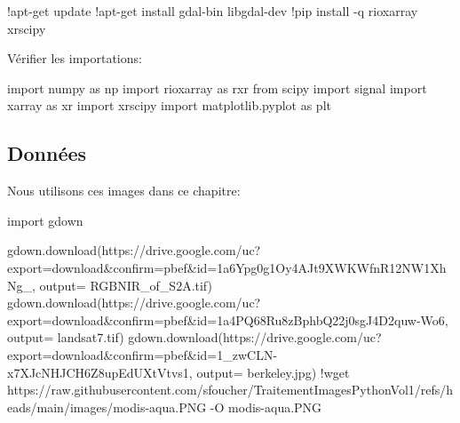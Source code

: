 \documentclass[
  french,
  11pt,
  letterpaper,
  open=any,
  twoside=false,
  french]{scrbook}
\newenvironment{Shaded}{\begin{snugshade}}{\end{snugshade}}
\newcommand{\BuiltInTok}[1]{\textcolor[rgb]{0.00,0.23,0.31}{#1}}
\newcommand{\ImportTok}[1]{\textcolor[rgb]{0.00,0.46,0.62}{#1}}
\newcommand{\NormalTok}[1]{\textcolor[rgb]{0.00,0.23,0.31}{#1}}
\newcommand{\OperatorTok}[1]{\textcolor[rgb]{0.37,0.37,0.37}{#1}}
\newcommand{\StringTok}[1]{\textcolor[rgb]{0.13,0.47,0.30}{#1}}
\begin{document}
\begin{Shaded}
\begin{Highlighting}[]
\OperatorTok{!}\NormalTok{apt}\OperatorTok{{-}}\NormalTok{get update}
\OperatorTok{!}\NormalTok{apt}\OperatorTok{{-}}\NormalTok{get install gdal}\OperatorTok{{-}}\BuiltInTok{bin}\NormalTok{ libgdal}\OperatorTok{{-}}\NormalTok{dev}
\OperatorTok{!}\NormalTok{pip install }\OperatorTok{{-}}\NormalTok{q rioxarray xrscipy}
\end{Highlighting}
\end{Shaded}

Vérifier les importations:

\begin{Shaded}
\begin{Highlighting}[]
\ImportTok{import}\NormalTok{ numpy }\ImportTok{as}\NormalTok{ np}
\ImportTok{import}\NormalTok{ rioxarray }\ImportTok{as}\NormalTok{ rxr}
\ImportTok{from}\NormalTok{ scipy }\ImportTok{import}\NormalTok{ signal}
\ImportTok{import}\NormalTok{ xarray }\ImportTok{as}\NormalTok{ xr}
\ImportTok{import}\NormalTok{ xrscipy}
\ImportTok{import}\NormalTok{ matplotlib.pyplot }\ImportTok{as}\NormalTok{ plt}
\end{Highlighting}
\end{Shaded}

\subsection{Données}\label{donnuxe9es}

Nous utilisons ces images dans ce chapitre:

\begin{Shaded}
\begin{Highlighting}[]
\ImportTok{import}\NormalTok{ gdown}

\NormalTok{gdown.download(}\StringTok{\textquotesingle{}https://drive.google.com/uc?export=download\&confirm=pbef\&id=1a6Ypg0g1Oy4AJt9XWKWfnR12NW1XhNg\_\textquotesingle{}}\NormalTok{, output}\OperatorTok{=} \StringTok{\textquotesingle{}RGBNIR\_of\_S2A.tif\textquotesingle{}}\NormalTok{)}
\NormalTok{gdown.download(}\StringTok{\textquotesingle{}https://drive.google.com/uc?export=download\&confirm=pbef\&id=1a4PQ68Ru8zBphbQ22j0sgJ4D2quw{-}Wo6\textquotesingle{}}\NormalTok{, output}\OperatorTok{=} \StringTok{\textquotesingle{}landsat7.tif\textquotesingle{}}\NormalTok{)}
\NormalTok{gdown.download(}\StringTok{\textquotesingle{}https://drive.google.com/uc?export=download\&confirm=pbef\&id=1\_zwCLN{-}x7XJcNHJCH6Z8upEdUXtVtvs1\textquotesingle{}}\NormalTok{, output}\OperatorTok{=} \StringTok{\textquotesingle{}berkeley.jpg\textquotesingle{}}\NormalTok{)}
\OperatorTok{!}\NormalTok{wget https:}\OperatorTok{//}\NormalTok{raw.githubusercontent.com}\OperatorTok{/}\NormalTok{sfoucher}\OperatorTok{/}\NormalTok{TraitementImagesPythonVol1}\OperatorTok{/}\NormalTok{refs}\OperatorTok{/}\NormalTok{heads}\OperatorTok{/}\NormalTok{main}\OperatorTok{/}\NormalTok{images}\OperatorTok{/}\NormalTok{modis}\OperatorTok{{-}}\NormalTok{aqua.PNG }\OperatorTok{{-}}\NormalTok{O modis}\OperatorTok{{-}}\NormalTok{aqua.PNG}
\end{Highlighting}
\end{Shaded}
\end{document}
